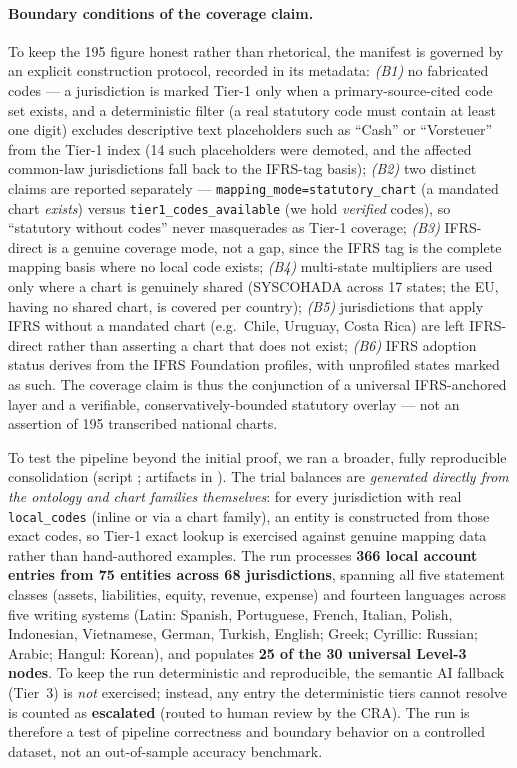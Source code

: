 \paragraph{Boundary conditions of the coverage claim.} To keep the 195 figure
honest rather than rhetorical, the manifest is governed by an explicit
construction protocol, recorded in its metadata: \emph{(B1)} no fabricated
codes --- a jurisdiction is marked Tier-1 only when a primary-source-cited code
set exists, and a deterministic filter (a real statutory code must contain at
least one digit) excludes descriptive text placeholders such as ``Cash'' or
``Vorsteuer'' from the Tier-1 index (14 such placeholders were demoted, and the
affected common-law jurisdictions fall back to the IFRS-tag basis); \emph{(B2)} two distinct claims are reported separately ---
\texttt{mapping\_mode=statutory\_chart} (a mandated chart \emph{exists}) versus
\texttt{tier1\_codes\_available} (we hold \emph{verified} codes), so ``statutory
without codes'' never masquerades as Tier-1 coverage; \emph{(B3)} IFRS-direct is
a genuine coverage mode, not a gap, since the IFRS tag is the complete mapping
basis where no local code exists; \emph{(B4)} multi-state multipliers are used
only where a chart is genuinely shared (SYSCOHADA across 17 states; the EU,
having no shared chart, is covered per country); \emph{(B5)} jurisdictions that
apply IFRS without a mandated chart (e.g.\ Chile, Uruguay, Costa Rica) are left
IFRS-direct rather than asserting a chart that does not exist; \emph{(B6)} IFRS
adoption status derives from the IFRS Foundation profiles, with unprofiled
states marked as such. The coverage claim is thus the conjunction of a
universal IFRS-anchored layer and a verifiable, conservatively-bounded statutory
overlay --- not an assertion of 195 transcribed national charts.

To test the pipeline beyond the initial proof, we ran a broader, fully
reproducible consolidation (script ;
artifacts in ). The trial
balances are \emph{generated directly from the ontology and chart families
themselves}: for every jurisdiction with real \texttt{local\_codes} (inline or
via a chart family), an entity is constructed from those exact codes, so Tier-1
exact lookup is exercised against genuine mapping data rather than hand-authored
examples. The run
processes \textbf{366 local account entries from 75 entities across 68
jurisdictions}, spanning all five statement classes (assets, liabilities,
equity, revenue, expense) and fourteen languages across five writing systems
(Latin: Spanish, Portuguese, French, Italian, Polish, Indonesian, Vietnamese,
German, Turkish, English; Greek; Cyrillic: Russian; Arabic; Hangul: Korean),
and populates \textbf{25 of the 30 universal Level-3 nodes}. To keep
the run deterministic and reproducible, the semantic AI fallback (Tier~3) is
\emph{not} exercised; instead, any entry the deterministic tiers cannot resolve
is counted as \textbf{escalated} (routed to human review by the CRA). The run is
therefore a test of pipeline correctness and boundary behavior on a controlled
dataset, not an out-of-sample accuracy benchmark.

